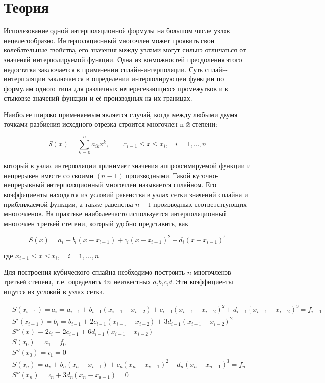 \section*{Теория}

Использование одной интерполяционной формулы на большом числе узлов
нецелесообразно. Интерполяционный многочлен может проявить свои колебательные
свойства, его значения между узлами могут сильно отличаться от значений
интерполируемой функции. Одна из возможностей преодоления этого недостатка
заключается в применении сплайн-интерполяции. Суть сплайн-интерполяции
заключается в определении интерполирующей функции по формулам одного типа для
различных непересекающихся промежутков и в стыковке значений функции и её
производных на их границах.

Наиболее широко применяемым является случай, когда между любыми двумя точками
разбиения исходного отрезка строится многочлен n-й степени:

$$S(x)=\sum_{k=0}^n a_{ik}x^k,\qquad
x_{i-1}\leqslant x \leqslant x_{i},\quad i=1,\hdots,n$$

который в узлах интерполяции принимает значения аппроксимируемой функции и
непрерывен вместе со своими $(n - 1)$ производными. Такой кусочно-непрерывный
интерполяционный многочлен называется сплайном. Его коэффициенты находятся из
условий равенства в узлах сетки значений сплайна и приближаемой функции, а также
равенства $n - 1$ производных соответствующих многочленов.
На практике наиболеечасто используется интерполяционный многочлен
третьей степени, который удобно представить, как

$$S(x) = a_i + b_i(x-x_{i-1}) + c_i(x-x_{i-1})^2 + d_i(x-x_{i-1})^3$$

где $x_{i-1}\leqslant x \leqslant x_{i},\quad i=1,\hdots,n$

Для построения кубического сплайна необходимо построить $n$ многочленов третьей
степени, т.е. определить $4n$ неизвестных $a$,$b$,$c$,$d$.
Эти коэффициенты ищутся из условий в узлах сетки.

$$\begin{aligned}
&S(x_{i-1}) = a_{i} = 
    a_{i-1} + b_{i-1}(x_{i-1}-x_{i-2}) + c_{i-1}(x_{i-1}-x_{i-2})^2 +
    d_{i-1}(x_{i-1}-x_{i-2})^3 = f_{i-1}\\
&S'(x_{i-1}) = b_i = b_{i-1} + 2c_{i-1}(x_{i-1}-x_{i-2}) +
    3d_{i-1}(x_{i-1}-x_{i-2})^2 \\
&S''(x) = 2c_i = 2c_{i-1} + 6d_{i-1}(x_{i-1}-x_{i-2}) \\
&S(x_0) = a_1 = f_0 \\
&S''(x_0) = c_1 = 0 \\
&S(x_n) = a_n + b_n(x_n-x_{i-1}) + c_n(x_n-x_{n-1})^2 +
    d_n(x_n-x_{n-1})^3 = f_n \\
&S''(x_n) = c_n + 3d_n(x_n - x_{n - 1}) = 0
\end{aligned}$$

